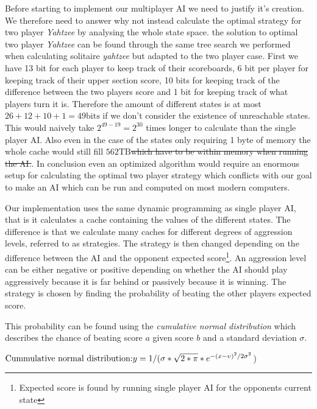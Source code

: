 Before starting to implement our multiplayer AI we need to justify it's creation. We therefore need to answer why not instead calculate the optimal strategy for two player \emph{Yahtzee} by analysing the whole state space. the solution to optimal two player \emph{Yahtzee} can be found through the same tree search we performed when calculating solitaire \emph{yahtzee} but adapted to the two player case. First we have 13 bit for each player to keep track of their scoreboards, 6 bit per player for keeping track of their upper section score, 10 bits for keeping track of the difference between the two players score and 1 bit for keeping track of what players turn it is. Therefore the amount of different states is at most $26+12+10+1 = 49\mbox{bits}$ if we don't consider the existence of unreachable states. This would naively take $2^{49-19} = 2^{30}$ times longer to calculate than the single player AI. Also even in the case of the states only requiring 1 byte of memory the whole cache would still fill $562 \mbox{TB}$\st{which have to be within memory when running the AI.}. In conclusion even an optimized algorithm would require an enormous setup for calculating the optimal two player strategy which conflicts with our goal to make an AI which can be run and computed on most modern computers. 

Our implementation uses the same dynamic programming as single player AI, that is it calculates a cache containing the values of the different states. The difference is that we calculate many caches for different degrees of aggression levels, referred to as strategies. The strategy is then changed depending on the difference between the AI and the opponent expected score\footnote{Expected score is found by running single player AI for the opponents current state}. An aggression level can be either negative or positive depending on whether the AI should play aggressively because it is far behind or passively because it is winning. The strategy is chosen by finding the probability of beating the other players expected score. 

This probability can be found using the \emph{cumulative normal distribution} which describes the chance of beating score $a$ given score $b$ and a standard deviation $\sigma$. %

$\newline\mbox{Cummulative normal distribution:} \newline y = 1  /(\sigma * \sqrt{2 * \pi} * e^{-(x - \upsilon)^2 / 2 \sigma^2}$)\newline

